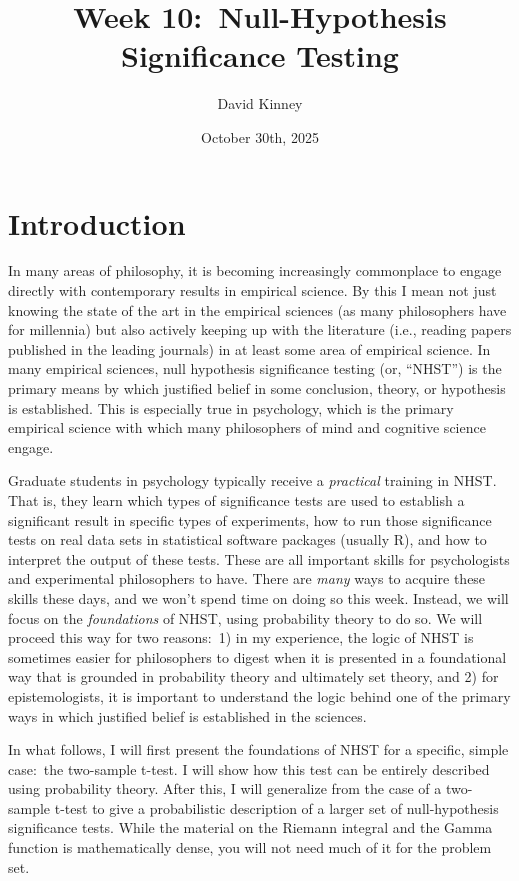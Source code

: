 \documentclass[11pt]{article}
\title{Week 10:\ Null-Hypothesis Significance Testing}
\author{David Kinney}
\date{October 30th, 2025}
\theoremstyle{definition}
\theoremstyle{remark}
\begin{document}
\maketitle

\section{Introduction}
In many areas of philosophy, it is becoming increasingly commonplace to engage directly with contemporary results in empirical science. By this I mean not just knowing the state of the art in the empirical sciences (as many philosophers have for millennia) but also actively keeping up with the literature (i.e., reading papers published in the leading journals) in at least some area of empirical science. In many empirical sciences, null hypothesis significance testing (or, ``NHST'') is the primary means by which justified belief in some conclusion, theory, or hypothesis is established. This is especially true in psychology, which is the primary empirical science with which many philosophers of mind and cognitive science engage.\par

Graduate students in psychology typically receive a \textit{practical} training in NHST. That is, they learn which types of significance tests are used to establish a significant result in specific types of experiments, how to run those significance tests on real data sets in statistical software packages (usually R), and how to interpret the output of these tests. These are all important skills for psychologists and experimental philosophers to have. There are \textit{many} ways to acquire these skills these days, and we won't spend time on doing so this week. Instead, we will focus on the \textit{foundations} of NHST, using probability theory to do so. We will proceed this way for two reasons:\ 1) in my experience, the logic of NHST is sometimes easier for philosophers to digest when it is presented in a foundational way that is grounded in probability theory and ultimately set theory, and 2) for epistemologists, it is important to understand the logic behind one of the primary ways in which justified belief is established in the sciences.\par 


In what follows, I will first present the foundations of NHST for a specific, simple case:\ the two-sample t-test. I will show how this test can be entirely described using probability theory. After this, I will generalize from the case of a two-sample t-test to give a probabilistic description of a larger set of null-hypothesis significance tests. While the material on the Riemann integral and the Gamma function is mathematically dense, you will not need much of it for the problem set.
\end{document}
